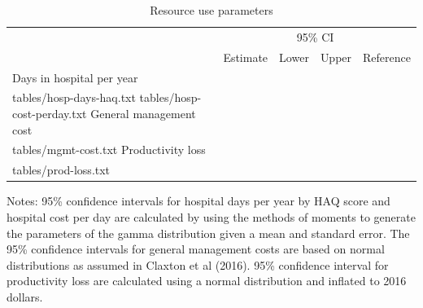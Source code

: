 \documentclass[11pt,final,fleqn]{article}\usepackage[]{graphicx}\usepackage[]{color}
\makeatletter
\theoremstyle{plain}
\newcommand*\ExpandableInput[1]{\@@input#1 }
\makeatother
\begin{document}
\begin{table}[!ht]
\begin{center}
\begin{threeparttable}
\caption{Resource use parameters} \label{tbl:resource-use-pars}
\footnotesize
\begin{tabularx}{\textwidth}{@{\extracolsep{\fill}}lcccc}
\hline
\multicolumn{2}{l}{} & \multicolumn{2}{c}{95\% CI} & \multicolumn{1}{l}{} \\
\cmidrule{3-4} 
\multicolumn{1}{l}{} & \multicolumn{1}{l}{Estimate} & \multicolumn{1}{c}{Lower} & \multicolumn{1}{c}{Upper} & \multicolumn{1}{c}{Reference} \\
\hline
Days in hospital per year \\
\ExpandableInput{tables/hosp-days-haq.txt}
\ExpandableInput{tables/hosp-cost-perday.txt}
General management cost \\
\ExpandableInput{tables/mgmt-cost.txt}
Productivity loss \\
\ExpandableInput{tables/prod-loss.txt}
\hline
\end{tabularx}
\scriptsize
Notes: 95\% confidence intervals for hospital days per year by HAQ score and hospital cost per day are calculated by using the methods of moments to generate the parameters of the gamma distribution given a mean and standard error. The 95\% confidence intervals for general management costs are based on normal distributions as assumed in Claxton et al (2016). 95\% confidence interval for productivity loss are calculated using a normal distribution and inflated to 2016 dollars. 
\end{threeparttable}
\end{center}
\end{table}
\end{document}
